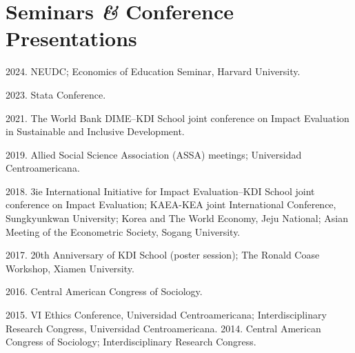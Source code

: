 \documentclass[a4paper, 10pt]{article}
\renewenvironment{itemize}{
  \begin{list}{}
    { \setlength{\itemsep}{5pt}
      \setlength{\parsep}{0pt}
      \setlength{\topsep}{0pt}
      \setlength{\leftmargin}{0em} } }{
  \end{list}}
\begin{document}


\section*{Seminars \textit{\&} Conference Presentations}

\begin{itemize}
  \item 2024. NEUDC; Economics of Education Seminar, Harvard University.
  \item 2023. Stata Conference. 
  \item 2021. The World Bank DIME--KDI School joint conference on
  Impact Evaluation in Sustainable and Inclusive Development. 
  \item 2019. Allied Social Science Association (ASSA) meetings;
  Universidad Centroamericana. 
  \item 2018. 3ie International Initiative for Impact Evaluation--KDI
  School joint conference on Impact Evaluation; KAEA-KEA joint International
  Conference, Sungkyunkwan University; Korea and The World Economy, Jeju
  National; Asian Meeting of the Econometric Society, Sogang University. 
  \item 2017. 20th Anniversary of KDI School (poster session); The
  Ronald Coase Workshop, Xiamen University. 
  \item 2016. Central American Congress of Sociology. 
  \item 2015. VI Ethics Conference, Universidad Centroamericana; Interdisciplinary Research Congress, Universidad Centroamericana. 2014. Central American Congress of Sociology; Interdisciplinary Research Congress.
\end{itemize}
\end{document}

